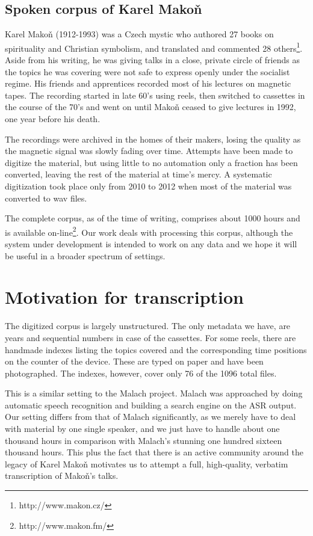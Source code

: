 \documentclass{llncs}
\begin{document}
\subsection{Spoken corpus of Karel Mako\v{n}}

Karel Mako\v{n} (1912-1993) was a Czech mystic who authored 27 books on
spirituality and Christian symbolism, and translated and commented 28
others\footnote{http://www.makon.cz/}.
Aside from his writing, he was giving talks in a close, private circle of
friends as the topics he was covering were not safe to express openly under the
socialist regime. His friends and apprentices recorded most of his lectures on
magnetic tapes. The recording started in late 60's using reels, then switched to
cassettes in the course of the 70's and went on until Mako\v{n}
ceased to give lectures in 1992, one year before his death.

The recordings were archived in the homes of their makers, losing the quality
as the magnetic signal was slowly fading over time. Attempts have been made to
digitize the material, but using little to no automation only a
fraction has been converted, leaving the rest of the material at time's mercy. A
systematic digitization took place only from 2010 to 2012 when most of the material
was converted to wav files.

The complete corpus, as of the time of writing, comprises about 1000 hours and
is available on-line\footnote{http://www.makon.fm/}. Our work deals
with processing this corpus, although the system under development is intended to
work on any data and we hope it will be useful in a broader spectrum of
settings.

\section{Motivation for transcription}

The digitized corpus is largely unstructured. The only metadata we have, are
years and sequential numbers in case of the cassettes. For some reels, there are
handmade indexes listing the topics covered and the corresponding time positions on the
counter of the device. These are typed on paper and have been photographed. The
indexes, however, cover only 76 of the 1096 total files.

This is a similar setting to the Malach\cite{malach} project. Malach was
approached by doing automatic speech recognition and building a search engine on
the ASR output. Our setting differs from that of Malach significantly, as we
merely have to deal with material by one single speaker, and we just have to handle about one thousand hours
in comparison with Malach's stunning one hundred sixteen thousand hours. This
plus the fact that there is an active community around the legacy of Karel
Mako\v{n} motivates us to attempt a full, high-quality, verbatim transcription
of Mako\v{n}'s talks.
\end{document}
